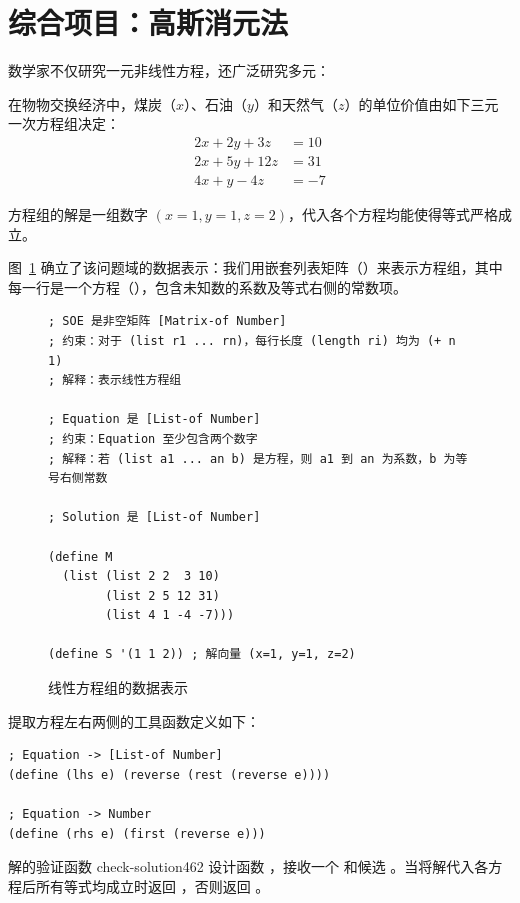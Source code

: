 \section{综合项目：高斯消元法}
\label{sec:28_3}

数学家不仅研究一元非线性方程，还广泛研究多元：
\begin{notebox}[资源物物交换问题]
在物物交换经济中，煤炭（$x$）、石油（$y$）和天然气（$z$）的单位价值由如下三元一次方程组决定：
\begin{align*}
  2x + 2y + 3z &= 10 \\
  2x + 5y + 12z &= 31 \\
  4x + y - 4z &= -7
\end{align*}
\end{notebox}

方程组的解是一组数字 $(x=1, y=1, z=2)$，代入各个方程均能使得等式严格成立。

图~\ref{fig:soe-rep} 确立了该问题域的数据表示：我们用嵌套列表矩阵（）来表示方程组，其中每一行是一个方程（），包含未知数的系数及等式右侧的常数项。

\begin{figure}[htbp]
  \centering
\begin{lstlisting}[language=BSL]
; SOE 是非空矩阵 [Matrix-of Number]
; 约束：对于 (list r1 ... rn)，每行长度 (length ri) 均为 (+ n 1)
; 解释：表示线性方程组

; Equation 是 [List-of Number]
; 约束：Equation 至少包含两个数字
; 解释：若 (list a1 ... an b) 是方程，则 a1 到 an 为系数，b 为等号右侧常数

; Solution 是 [List-of Number]

(define M
  (list (list 2 2  3 10)
        (list 2 5 12 31)
        (list 4 1 -4 -7)))

(define S '(1 1 2)) ; 解向量 (x=1, y=1, z=2)
\end{lstlisting}
  \caption{线性方程组的数据表示}
  \label{fig:soe-rep}
\end{figure}

提取方程左右两侧的工具函数定义如下：
\begin{lstlisting}[language=BSL]
; Equation -> [List-of Number]
(define (lhs e) (reverse (rest (reverse e))))

; Equation -> Number
(define (rhs e) (first (reverse e)))
\end{lstlisting}

\begin{exercise}{解的验证函数 check-solution}{462}\label{ex:462}
设计函数 ，接收一个  和候选 。当将解代入各方程后所有等式均成立时返回 ，否则返回 。
\end{exercise}


